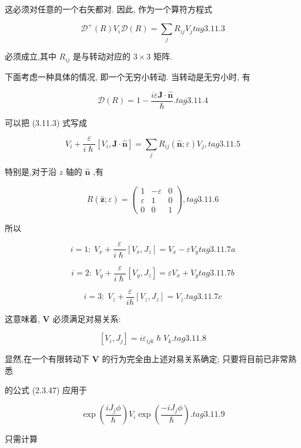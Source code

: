 这必须对任意的一个右矢都对. 因此, 作为一个算符方程式

$$
{\mathcal{D}}^{ + }\left( R\right) {V}_{i}\mathcal{D}\left( R\right) = \mathop{\sum }\limits_{j}{R}_{ij}{V}_{j} tag{3.11.3}
$$

必须成立,其中 ${R}_{ij}$ 是与转动对应的 $3 \times 3$ 矩阵.

下面考虑一种具体的情况, 即一个无穷小转动. 当转动是无穷小时, 有

$$
\mathcal{D}\left( R\right) = 1 - \frac{{i\varepsilon }\mathbf{J} \cdot \widehat{\mathbf{n}}}{\hslash }. tag{3.11.4}
$$

可以把 (3.11.3) 式写成

$$
{V}_{i} + \frac{\varepsilon }{i\hslash }\left\lbrack {{V}_{i},\mathbf{J} \cdot \widehat{\mathbf{n}}}\right\rbrack = \mathop{\sum }\limits_{j}{R}_{ij}\left( {\widehat{\mathbf{n}};\varepsilon }\right) {V}_{j}, tag{3.11.5}
$$

特别是,对于沿 $z$ 轴的 $\widehat{\mathbf{n}}$ ,有

$$
R\left( {\widehat{\mathbf{z}};\varepsilon }\right) = \left( \begin{matrix} 1 & - \varepsilon & 0 \\ \varepsilon & 1 & 0 \\ 0 & 0 & 1 \end{matrix}\right) , tag{3.11.6}
$$

所以

$$
i = 1 : \;{V}_{x} + \frac{\varepsilon }{i\hslash }\left\lbrack {{V}_{x},{J}_{z}}\right\rbrack = {V}_{x} - \varepsilon {V}_{y} tag{3.11.7a}
$$

$$
i = 2 : \;{V}_{y} + \frac{\varepsilon }{i\hslash }\left\lbrack {{V}_{y},{J}_{z}}\right\rbrack = \varepsilon {V}_{x} + {V}_{y} tag{3.11.7b}
$$

$$
i = 3 : \;{V}_{z} + \frac{\varepsilon }{ih}\left\lbrack {{V}_{z},{J}_{z}}\right\rbrack = {V}_{z}. tag{3.11.7c}
$$

这意味着, $\mathbf{V}$ 必须满足对易关系:

$$
\left\lbrack {{V}_{i},{J}_{j}}\right\rbrack = i{\varepsilon }_{ijk}\hslash {V}_{k}. tag{3.11.8}
$$

显然,在一个有限转动下 $\mathbf{V}$ 的行为完全由上述对易关系确定; 只要将目前已非常熟悉

的公式 (2.3.47) 应用于

$$
\exp \left( \frac{i{J}_{j}\phi }{\hslash }\right) {V}_{i}\exp \left( \frac{-i{J}_{j}\phi }{\hslash }\right) . tag{3.11.9}
$$

只需计算

